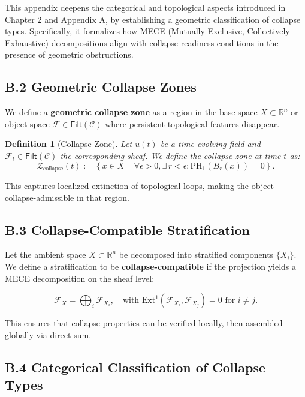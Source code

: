 \documentclass[11pt]{article}
\newtheorem{definition}[theorem]{Definition}
\begin{document}
This appendix deepens the categorical and topological aspects introduced in Chapter 2 and Appendix A,  
by establishing a geometric classification of collapse types. Specifically, it formalizes how MECE  
(Mutually Exclusive, Collectively Exhaustive) decompositions align with collapse readiness conditions  
in the presence of geometric obstructions.

\subsection*{B.2 Geometric Collapse Zones}

We define a \textbf{geometric collapse zone} as a region in the base space \( X \subset \mathbb{R}^n \)  
or object space \( \mathcal{F} \in \mathsf{Filt}(\mathcal{C}) \) where persistent topological features disappear.

\begin{definition}[Collapse Zone]
Let \( u(t) \) be a time-evolving field and \( \mathcal{F}_t \in \mathsf{Filt}(\mathcal{C}) \) the corresponding sheaf.  
We define the collapse zone at time \( t \) as:
\[
\mathcal{Z}_{\text{collapse}}(t) := \left\{ x \in X \,\middle|\, \forall \epsilon > 0, \exists\, r < \epsilon : \mathrm{PH}_1(B_r(x)) = 0 \right\}.
\]
\end{definition}

This captures localized extinction of topological loops, making the object collapse-admissible in that region.

\subsection*{B.3 Collapse-Compatible Stratification}

Let the ambient space \( X \subset \mathbb{R}^n \) be decomposed into stratified components \( \{ X_i \} \).  
We define a stratification to be \textbf{collapse-compatible} if the projection yields a MECE decomposition  
on the sheaf level:

\[
\mathcal{F}_X = \bigoplus_i \mathcal{F}_{X_i}, \quad \text{with } \mathrm{Ext}^1(\mathcal{F}_{X_i}, \mathcal{F}_{X_j}) = 0 \text{ for } i \ne j.
\]

This ensures that collapse properties can be verified locally, then assembled globally via direct sum.

\subsection*{B.4 Categorical Classification of Collapse Types}
\end{document}

